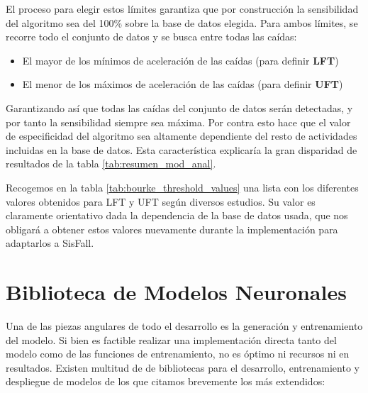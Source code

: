 El proceso para elegir estos límites garantiza que por construcción la sensibilidad del algoritmo sea del 100\% sobre la base de datos elegida. Para ambos límites, se recorre todo el conjunto de datos y se busca entre todas las caídas:
\begin{itemize}
  \item El mayor de los mínimos de aceleración de las caídas (para definir \textbf{LFT})
  \item El menor de los máximos de aceleración de las caídas (para definir \textbf{UFT})
\end{itemize}

Garantizando así que todas las caídas del conjunto de datos serán detectadas, y por tanto la sensibilidad siempre sea máxima. Por contra esto hace que el valor de especificidad del algoritmo sea altamente dependiente del resto de actividades incluidas en la base de datos. Esta característica explicaría la gran disparidad de resultados de la tabla \ref{tab:resumen_mod_anal}.


Recogemos en la tabla \ref{tab:bourke_threshold_values} una lista con los diferentes valores obtenidos para LFT y UFT según diversos estudios. Su valor es claramente orientativo dada la dependencia de la base de datos usada, que nos obligará a obtener estos valores nuevamente durante la implementación para adaptarlos a SisFall.



\section{Biblioteca de Modelos Neuronales} \label{sec:req:tflite}

Una de las piezas angulares de todo el desarrollo es la generación y entrenamiento del modelo. Si bien es factible realizar una implementación directa tanto del modelo como de las funciones de entrenamiento, no es óptimo ni recursos ni en resultados. Existen multitud de de bibliotecas para el desarrollo, entrenamiento y despliegue de modelos de los que citamos brevemente los más extendidos:

